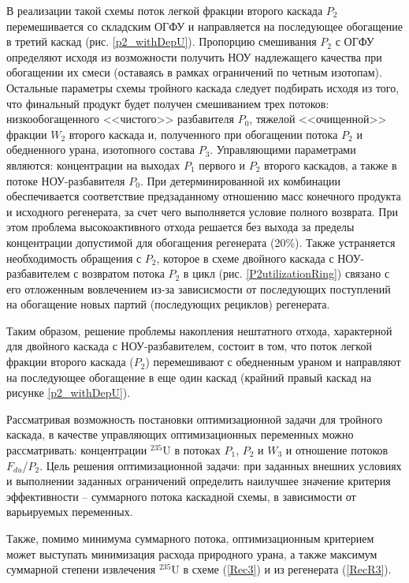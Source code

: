 В реализации такой схемы поток легкой фракции второго каскада $P_2$ перемешивается со складским ОГФУ и направляется на последующее обогащение в третий каскад (рис. \ref{p2_withDepU}). Пропорцию смешивания $P_2$ с ОГФУ определяют исходя из возможности получить НОУ надлежащего качества при обогащении их смеси (оставаясь в рамках ограничений по четным изотопам). Остальные параметры схемы тройного каскада следует подбирать исходя из того, что финальный продукт будет получен смешиванием трех потоков: низкообогащенного <<чистого>> разбавителя $P_0$, тяжелой <<очищенной>> фракции $W_2$ второго каскада и, полученного при обогащении потока $P_2$ и обедненного урана, изотопного состава $P_3$. Управляющими параметрами являются: концентрации на выходах $P_1$ первого и $P_2$ второго каскадов, а также в потоке НОУ-разбавителя $P_0$. При детерминированной их комбинации обеспечивается соответствие предзаданному отношению масс конечного продукта и исходного регенерата, за счет чего выполняется условие полного возврата. При этом проблема высокоактивного отхода решается без выхода за пределы концентрации допустимой для обогащения регенерата (20\%). Также устраняется необходимость обращения с $P_2$, которое в схеме двойного каскада с НОУ-разбавителем с возвратом потока $P_2$ в цикл (рис. \ref{P2utilizationRing}) связано с его отложенным вовлечением из-за зависисмости от последующих поступлений на обогащение новых партий (последующих рециклов) регенерата.

Таким образом, решение проблемы накопления нештатного отхода, характерной для двойного каскада с НОУ-разбавителем, состоит в том, что поток легкой фракции второго каскада ($P_2$) перемешивают с обедненным ураном и направляют на последующее обогащение в еще один каскад (крайний правый каскад на рисунке \ref{p2_withDepU}).

Рассматривая возможность постановки оптимизационной задачи для тройного каскада, в качестве управляющих оптимизационных переменных можно рассматривать: концентрации $^{235}$U в потоках $P_1$, $P_2$ и $W_3$ и отношение потоков $F_{du}$/$P_2$.
Цель решения оптимизационной задачи: при заданных внешних условиях и выполнении заданных ограничений определить наилучшее значение критерия эффективности -- суммарного потока каскадной схемы, в зависимости от варьируемых переменных.

Также, помимо минимума суммарного потока, оптимизационным критерием может выступать минимизация расхода природного урана, а также максимум суммарной степени извлечения $^{235}$U в схеме (\ref{Rec3}) и из регенерата (\ref{RecR3}).

